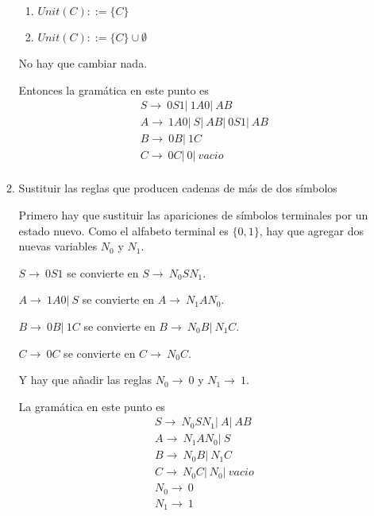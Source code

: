 \documentclass{article}
\begin{document}
\begin{enumerate}
\begin{enumerate}
        \begin{enumerate}
            \item $Unit(C) ::= \{C\}$
            \item $Unit(C) ::= \{C\} \cup \emptyset$
        \end{enumerate}
        No hay que cambiar nada.

        Entonces la gramática en este punto es 
        \begin{align*}
            &S \rightarrow \ 0S1 |\ 1A0 |\ AB \\
            &A \rightarrow \ 1A0 |\ S| \ AB | \ 0S1| \ AB\\
            &B \rightarrow \ 0B |\ 1C \\
            &C \rightarrow \ 0C |\ 0 |\ vacio \\
        \end{align*}

        \item Sustituir las reglas que producen cadenas de más de dos símbolos
        
        Primero hay que sustituir las apariciones de símbolos terminales por un
        estado nuevo. Como el alfabeto terminal es $\{0, 1\}$, hay que agregar 
        dos nuevas variables $N_0$ y $N_1$.

        $S \rightarrow \ 0S1$ se convierte en $S \rightarrow \ N_0SN_1$.

        $A \rightarrow \ 1A0 |\ S$ se convierte en 
        $A \rightarrow \ N_1AN_0$.

        $B \rightarrow \ 0B |\ 1C$ se convierte en $B \rightarrow \ N_0B |\ N_1C$.

        $C \rightarrow \ 0C$ se convierte en $C \rightarrow \ N_0C$.
        
        Y hay que añadir las reglas $N_0 \rightarrow \ 0 $ y $N_1 \rightarrow \ 1$.

        La gramática en este punto es
        \begin{align*}
            &S \rightarrow \ N_0SN_1 |\ A |\ AB \\
            &A \rightarrow \ N_1AN_0 |\ S \\
            &B \rightarrow \ N_0B |\ N_1C \\
            &C \rightarrow \ N_0C |\ N_0 |\ vacio \\
            &N_0 \rightarrow \ 0 \\
            &N_1 \rightarrow \ 1
        \end{align*}


\end{enumerate}
\end{enumerate}
\end{document}
